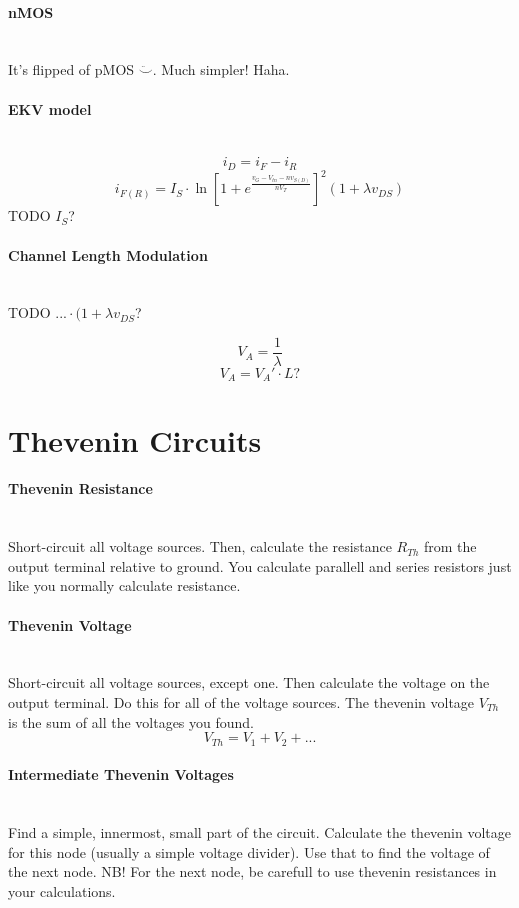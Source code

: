 \documentclass[twocolumn]{article}
\begin{document}
    \paragraph{nMOS} \hfill \\
      It's flipped of pMOS $\ddot\smile$. Much simpler! Haha.
    \paragraph{EKV model} \hfill \\
      $$i_D = i_F - i_R$$
      $$i_{F(R)} = I_S \cdot
                   \ln \left[ 1 + e^{\frac{v_G - V_{tn} - nv_{S(D)}}{nV_T}}
                       \right] ^2
                   (1 + \lambda v_{DS})$$
      TODO $I_S$?
    \paragraph{Channel Length Modulation} \hfill \\
      TODO $... \cdot (1 + \lambda v_{DS}$?

      $$V_A = \frac{1}{\lambda}$$
      $$V_A = V_A' \cdot L?$$
  \section{Thevenin Circuits}
    \paragraph{Thevenin Resistance} \hfill \\
      Short-circuit all voltage sources.
      Then, calculate the resistance $R_{Th}$ from the output terminal relative
      to ground.
      You calculate parallell and series resistors just like you normally
     calculate resistance.
    \paragraph{Thevenin Voltage} \hfill \\
      Short-circuit all voltage sources, except one.
      Then calculate the voltage on the output terminal.
      Do this for all of the voltage sources.
      The thevenin voltage $V_{Th}$ is the sum of all the voltages you found.
      $$V_{Th} = V_1 + V_2 + ...$$
    \paragraph{Intermediate Thevenin Voltages} \hfill \\
      Find a simple, innermost, small part of the circuit.
      Calculate the thevenin voltage for this node (usually a simple voltage
      divider).
      Use that to find the voltage of the next node.
      NB! For the next node, be carefull to use thevenin resistances in
      your calculations.
\end{document}
